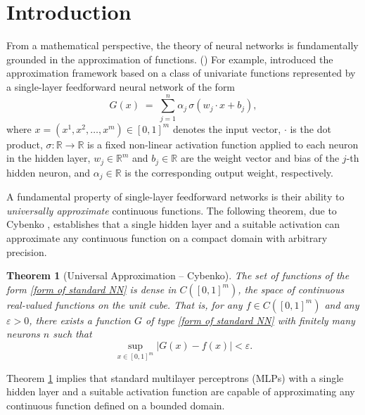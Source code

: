 \documentclass[11pt,reqno]{amsart}
\numberwithin{equation}{section}
\newtheorem{theorem}{Theorem}[section]
\theoremstyle{remark}
\theoremstyle{definition}
\newcommand\bR{\mathbb{R}}
\newcommand\ep{\varepsilon}
\begin{document}
\maketitle

\section{Introduction}
\label{sec:intro}



From a mathematical perspective, the theory of neural networks is fundamentally grounded in the approximation of functions. (\cite{cybenko1989approximation,hornik1991approximation,leshno1993multilayer,pinkus1999approximation})
For example, \cite{cybenko1989approximation} introduced the approximation framework based on a class of univariate functions represented by a single-layer feedforward neural network of the form
\begin{equation}
    \label{form of standard NN}
G(x) \;=\; \sum_{j=1}^{n} \alpha_j\, \sigma(w_j\cdot x + b_j),
\end{equation}
where $x = (x^{1},x^{2},\dots,x^{m}) \in [0,1]^m$ denotes the input vector, $\cdot$ is the dot product, $\sigma: \bR \to \bR$ is a fixed non-linear activation function applied to each neuron in the hidden layer, $w_j \in \bR^m$ and $b_j \in \bR$ are the weight vector and bias of the $j$-th hidden neuron, and $\alpha_j \in \bR$ is the corresponding output weight, respectively.




A fundamental property of single-layer feedforward networks is their ability to \textit{universally approximate} continuous functions.  The following theorem, due to Cybenko \cite{cybenko1989approximation}, establishes that a single hidden layer and a suitable activation can approximate any continuous function on a compact domain with arbitrary precision.
\begin{theorem}[Universal Approximation -- Cybenko] 
\label{Cybenko theorem}
The set of functions of the form \eqref{form of standard NN} is dense in $C([0,1]^m)$, the space of continuous real-valued functions on the unit cube. That is, for any $f\in C([0,1]^m)$ and any $\ep>0$, there exists a function $G$ of type \eqref{form of standard NN} with finitely many neurons $n$ such that 
\begin{equation*}
\sup_{x\in [0,1]^{m}}|G(x)-f(x)|<\ep.
\end{equation*}
\end{theorem}
Theorem \ref{Cybenko theorem} implies that standard multilayer perceptrons (MLPs) with a single hidden layer and a suitable activation function are capable of approximating any continuous function defined on a bounded domain.
\end{document}

